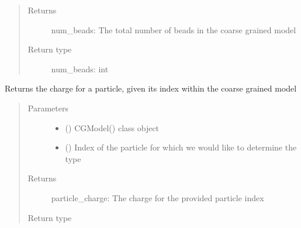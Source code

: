 \documentclass[letterpaper,12pt,english,openany,oneside]{sphinxmanual}
\begin{document}
\begin{fulllineitems}
\begin{fulllineitems}
\begin{quote}
\begin{description}
\item[{Returns}] \leavevmode
num\_beads: The total number of beads in the coarse grained model

\item[{Return type}] \leavevmode
num\_beads: int

\end{description}\end{quote}

\end{fulllineitems}


\begin{fulllineitems}
\label{\detokenize{cg_model:cg_model.cgmodel.CGModel.get_particle_charge}}
Returns the charge for a particle, given its index within the coarse grained model
\begin{quote}\begin{description}
\item[{Parameters}] \leavevmode\begin{itemize}
\item {} 
 () \textendash{} CGModel() class object

\item {} 
 () \textendash{} Index of the particle for which we would like to determine the type

\end{itemize}

\item[{Returns}] \leavevmode
particle\_charge: The charge for the provided particle index

\item[{Return type}] \leavevmode



\end{description}\end{quote}

\end{fulllineitems}


\end{fulllineitems}
\end{document}
